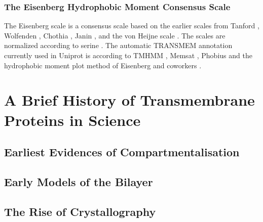 \subsubsection{The Eisenberg Hydrophobic Moment Consensus Scale}
The Eisenberg scale is a consensus scale based on the earlier scales from Tanford \cite{Nozaki1971}, Wolfenden \cite{Rose1993}, Chothia \cite{Chothia1976}, Janin \cite{Janin1979}, and the von Heijne scale \cite{VonHeijne1979}. The scales are normalized according to serine \cite{Eisenberg1984}. The automatic TRANSMEM annotation currently used in Uniprot is according to TMHMM \cite{Krogh2001}, Memsat \cite{Jones2007}, Phobius \cite{Kall2004} and the hydrophobic moment plot method of Eisenberg and coworkers \cite{Eisenberg1984}.


\section{A Brief History of Transmembrane Proteins in Science}
\subsection{Earliest Evidences of Compartmentalisation}


\subsection{Early Models of the Bilayer}

\subsection{The Rise of Crystallography}

